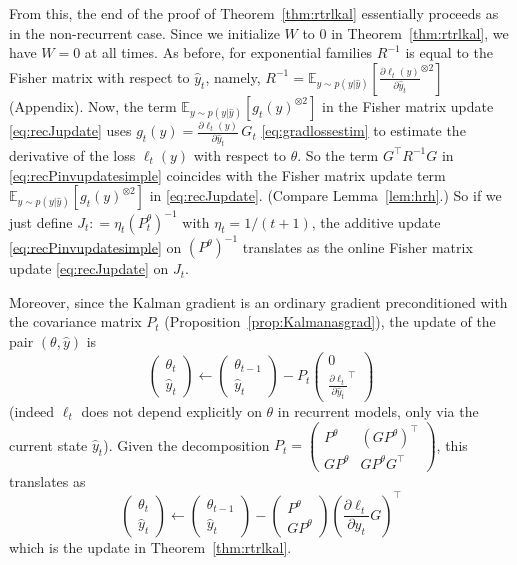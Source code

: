 \documentclass[11pt,a4paper]{article}
\newcommand{\deq}{\mathrel{\mathop{:}}=}
\def\ds{\displaystyle}
\newcommand{\E}{\mathbb{E}}
\newcommand{\1}{\mathbbm{1}}
\theoremstyle{yannthm}
\theoremstyle{yannthm2}
\newcommand{\transp}[1]{#1^{\!\top}\!}
\newcommand{\Ptheta}{P^\theta}
\numberwithin{equation}{section}
\begin{document}
From this, the end of the proof of Theorem~\ref{thm:rtrlkal} essentially proceeds
as in the non-recurrent case. Since we initialize $W$ to $0$ in
Theorem~\ref{thm:rtrlkal}, we have
$W=0$ at all times. As before, for exponential families
$R^{-1}$ is equal to the Fisher matrix with respect to $\hat y_t$,
namely, $R^{-1}=\E_{y \sim p(y|\hat y)}\ds
\left[\frac{\partial \ell_t(y)}{\partial \hat y_t}^{\otimes 2}\right]$ 
(Appendix).
Now, the term $\E_{y \sim p(y|\hat y)}
\left[g_t(y)^{\otimes
2}\right]$ in the Fisher matrix update \eqref{eq:recJupdate} uses
$g_t(y)=\ds\frac{\partial \ell_t(y)}{\partial\hat y_t} \, G_t$
\eqref{eq:gradlossestim} to estimate the derivative of the loss
$\ell_t(y)$
with respect to $\theta$. So
the term $\transp{G}R^{-1}G$ in \eqref{eq:recPinvupdatesimple} coincides with the Fisher
matrix update term $\E_{y \sim p(y|\hat y)} \left[g_t(y)^{\otimes
2}\right]$ in \eqref{eq:recJupdate}. (Compare Lemma~\ref{lem:hrh}.)
So if we just define $J_t\deq \eta_t (\Ptheta_t)^{-1}$ with
$\eta_t=1/(t+1)$, the additive update \eqref{eq:recPinvupdatesimple} on
$(\Ptheta)^{-1}$
translates as the online Fisher matrix update \eqref{eq:recJupdate} on
$J_t$.

Moreover, since the Kalman gradient is an ordinary gradient
preconditioned with the covariance matrix $P_t$
(Proposition~\ref{prop:Kalmanasgrad}), the update of the pair
$(\theta,\hat y)$ is
\begin{equation}
\begin{pmatrix} \theta_t \\ \hat y_t \end{pmatrix}
\gets \begin{pmatrix} \theta_{t-1} \\ \hat y_{t} \end{pmatrix} 
-P_t \begin{pmatrix} 0 \\ \ds\transp{\frac{\partial \ell_t}{\partial \hat
y_t}}\end{pmatrix}
\end{equation}
(indeed $\ell_t$ does not depend explicitly on $\theta$ in recurrent
models, only via the current state $\hat y_t$).
Given the decomposition $P_t=
\begin{pmatrix}
\Ptheta & \transp{(G \Ptheta)}
\\ G \Ptheta & G \Ptheta \transp{G}
\end{pmatrix}
$, this translates as
\begin{equation}
\begin{pmatrix} \theta_t \\ \hat y_t \end{pmatrix}
\gets \begin{pmatrix} \theta_{t-1} \\ \hat y_{t} \end{pmatrix} 
-\begin{pmatrix} \Ptheta  \\ G \Ptheta \end{pmatrix}\transp{\left(\frac{\partial \ell_t}{\partial \hat
y_t}G\right)}
\end{equation}
which is the update in Theorem~\ref{thm:rtrlkal}.
\end{document}
